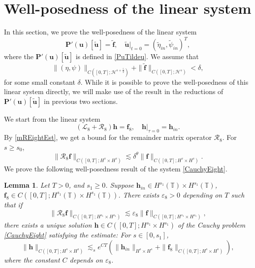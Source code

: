 \documentclass[12pt]{amsart}
\newtheorem{lemma}[theorem]{Lemma}
\theoremstyle{remark}
\theoremstyle{definition}
\numberwithin{equation}{section}
\renewcommand{\H}{{\mathcal H }}
\newcommand{\f}{\frac}
\newcommand{\T}{{\mathbb T}}
\newcommand{\mL}{\mathcal{L}}
\newcommand{\mR}{\mathcal{R}}
\begin{document}
\section{Well-posedness of the linear system} \label{s:Well}
In this section, we prove the well-posedness of the linear system 
\begin{equation} \label{CauchyZero}
    \mathbf{P}'(\mathbf{u})[\tilde{\mathbf{u}}]= \tilde{\mathbf{f}}, \quad \tilde{\mathbf{u}}|_{t=0} = (\tilde{\eta}_{in}, \tilde{\psi}_{in})^T,
\end{equation}
where the $\mathbf{P}'(\mathbf{u})[\tilde{\mathbf{u}}]$ is defined in \eqref{PuTildeu}.
We assume that
\begin{equation*}
\|(\eta, \psi)\|_{C([0,T]; \H^{s+\f52})} + \| \tilde{\mathbf{f}}\|_{C([0,T];\H^s)}<\delta, 
\end{equation*}
for some small constant $\delta$.
While it is possible to prove the well-posedness of this linear system directly, we will make use of the result in the reductions of $\mathbf{P}'(\mathbf{u})[\tilde{\mathbf{u}}]$ in previous two sections.

We start from the linear system 
\begin{equation} \label{CauchyEight}
  (\mL_8 + \mR_8)\mathbf{h} = \mathbf{f}_8, \quad \mathbf{h}|_{\tau=0} = \mathbf{h}_{in}. 
\end{equation}
By \eqref{mREightEst}, we get a bound for the remainder matrix operator $\mR_8$.
For $s \geq s_0$,
\begin{equation*}
 \|\mR_8 \mathbf{f} \|_{C([0,T];H^{s}\times H^s)} \lesssim \delta^\theta \|\mathbf{f}\|_{C([0,T];H^{s}\times H^s)}.
\end{equation*}
We prove the following well-posedness result of the system \eqref{CauchyEight}.
\begin{lemma} \label{t:CauchyEight}
Let $T>0$, and $s_1\geq 0$.
Suppose $\mathbf{h}_{in} \in H^{s_1}(\T)\times H^{s_1}(\T)$, $\mathbf{f}_8\in C([0,T];H^{s_1}(\T)\times H^{s_1}(\T))$.
There exists $\varepsilon_8>0$ depending on $T$ such that if 
\begin{equation*}
 \|\mR_8 \mathbf{f} \|_{C([0,T];H^{s_1}\times H^{s_1})} \lesssim \varepsilon_8 \|\mathbf{f}\|_{C([0,T];H^{s_1}\times H^{s_1})},
\end{equation*}
there exists a unique solution $\mathbf{h}\in C([0,T];H^{s_1}\times H^{s_1})$ of the Cauchy problem \eqref{CauchyEight} satisfying the estimate:
For $s\in [0, s_1]$, 
\begin{equation} \label{mR8EnergyEst}
 \| \mathbf{h}\|_{C([0,T]; H^s\times H^s)} \lesssim_s e^{CT}\left(\|\mathbf{h}_{in} \|_{H^s\times H^s} + \| \mathbf{f}_8\|_{C([0,T]; H^s\times H^s)}\right), 
\end{equation}
where the constant $C$ depends on $\varepsilon_8$.
\end{lemma}
\end{document}
